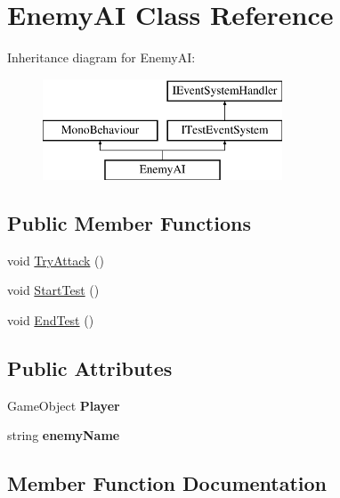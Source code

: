 \hypertarget{class_enemy_a_i}{}\section{Enemy\+AI Class Reference}
\label{class_enemy_a_i}
Inheritance diagram for Enemy\+AI\+:\begin{figure}[H]
\begin{center}
\leavevmode
\includegraphics[height=3.000000cm]{class_enemy_a_i}
\end{center}
\end{figure}
\subsection*{Public Member Functions}
\begin{DoxyCompactItemize}
\item 
void \mbox{\hyperlink{class_enemy_a_i_a9c377a8c65147355decf5f02cf2785ea}{Try\+Attack}} ()
\item 
void \mbox{\hyperlink{class_enemy_a_i_a8d23dd153a4f273abaae5c174d10a6d2}{Start\+Test}} ()
\item 
void \mbox{\hyperlink{class_enemy_a_i_a63dc8e816322f34ec0360a1189fb931e}{End\+Test}} ()
\end{DoxyCompactItemize}
\subsection*{Public Attributes}
\begin{DoxyCompactItemize}
\item 
\mbox{\label{class_enemy_a_i_a415f57823bb4f2490f98bedb56ae6b49}} 
Game\+Object {\bfseries Player}
\item 
\mbox{\label{class_enemy_a_i_a207b39ab95bee140d8808cd92f966891}} 
string {\bfseries enemy\+Name}
\end{DoxyCompactItemize}


\subsection{Member Function Documentation}
\mbox{\label{class_enemy_a_i_a63dc8e816322f34ec0360a1189fb931e}} 
